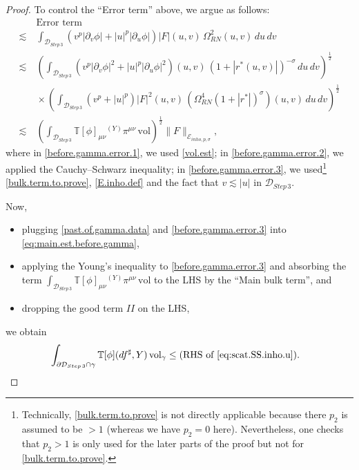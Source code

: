 \documentclass[10pt, reqno]{amsart}
\theoremstyle{definition}
\theoremstyle{remark}
\numberwithin{equation}{section}
\def\ls{\lesssim}
\newcommand{\rd}{\partial}
\newcommand{\0}{\emptyset}
\newcommand{\Omg}{\Omega}
\newcommand{\f}{\frac}
\newcommand{\vol}{\mathrm{vol}}
\begin{document}
\begin{proof}
To control the ``Error term'' above, we argue as follows:
\begin{align}
&\:\mbox{Error term}\nonumber\\
\ls &\:\int_{\mathcal D_{Step\,3}} (v^p|\rd_v\phi| + |u|^p|\rd_u\phi|) |F|(u,v)\,\Omg_{RN}^2(u,v)\,du\,dv \label{before.gamma.error.1}\\
\ls &\:\left(\int_{\mathcal D_{Step\,3}} (v^p|\rd_v\phi|^2 + |u|^p|\rd_u\phi|^2)(u,v)\,(1+|r^*(u,v)|)^{-\sigma}\,du\,dv\right)^{\f 12} \nonumber\\
&\: \times \left(\int_{\mathcal D_{Step\,3}} (v^p + |u|^p) |F|^2(u,v)\,(\Omg_{RN}^4(1+|r^*|)^\sigma)(u,v)\,du\,dv\right)^{\f 12} \label{before.gamma.error.2}\\
\ls &\: \left(\int_{\mathcal D_{Step\,3}} \mathbb T[\phi]_{\mu\nu}{ }^{(Y)}\pi^{\mu\nu} \,\vol \right)^{\f 12} \|F\|_{\mathcal E_{inho,p,\sigma}},\label{before.gamma.error.3} 
\end{align}
where in \eqref{before.gamma.error.1}, we used \eqref{vol.est}; in \eqref{before.gamma.error.2}, we applied the Cauchy--Schwarz inequality; in \eqref{before.gamma.error.3}, we used\footnote{Technically, \eqref{bulk.term.to.prove} is not directly applicable because there $p_2$ is assumed to be $> 1$ (whereas we have $p_2 = 0$ here). Nevertheless, one checks that $p_2>1$ is only used for the later parts of the proof but not for \eqref{bulk.term.to.prove}.} \eqref{bulk.term.to.prove}, \eqref{E.inho.def} and the fact that $v \ls |u|$ in $\mathcal D_{Step\,3}$.

Now, 
\begin{itemize}
\item plugging \eqref{past.of.gamma.data} and \eqref{before.gamma.error.3} into \eqref{eq:main.est.before.gamma}, 
\item applying the Young's inequality to \eqref{before.gamma.error.3} and absorbing the term $\int_{\mathcal D_{Step\,3}} \mathbb T[\phi]_{\mu\nu}{ }^{(Y)}\pi^{\mu\nu} \,\vol$ to the LHS by the ``Main bulk term'', and
\item dropping the good term $II$ on the LHS,
\end{itemize}
we obtain
\begin{equation}\label{past.of.gamma.main}
\begin{split}
&\int_{\rd\mathcal D_{Step\,3}\cap\gamma} \mathbb T[\phi](df^\sharp, Y)\,\vol_{\gamma}\leq \mbox{(RHS of \eqref{eq:scat.SS.inho.u})}.
\end{split}
\end{equation}


\end{proof}
\end{document}
